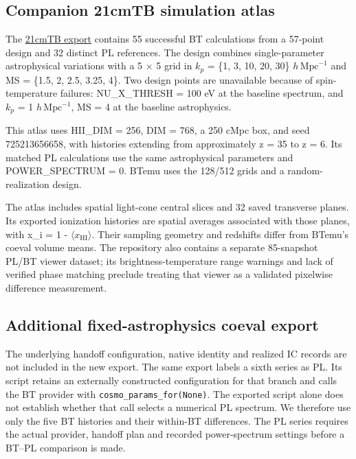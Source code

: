 \subsection{Companion 21cmTB simulation atlas}\label{companion-21cmtb-simulation-atlas}

The \href{https://github.com/HainaHuang729/21cmTB}{21cmTB export} contains 55 successful BT calculations from a 57-point design and 32 distinct PL references. The design combines single-parameter astrophysical variations with a 5 \(\times\) 5 grid in \ensuremath{k_p} = \{1, 3, 10, 20, 30\} $h\,\mathrm{Mpc}^{-1}$ and MS = \{1.5, 2, 2.5, 3.25, 4\}. Two design points are unavailable because of spin-temperature failures: NU\_X\_THRESH = 100 eV at the baseline spectrum, and \ensuremath{k_p} = 1 $h\,\mathrm{Mpc}^{-1}$, MS = 4 at the baseline astrophysics.

This atlas uses HII\_DIM = 256, DIM = 768, a 250 cMpc box, and seed 725213656658, with histories extending from approximately z = 35 to z = 6. Its matched PL calculations use the same astrophysical parameters and POWER\_SPECTRUM = 0. BTemu uses the 128/512 grids and a random-realization design.

The atlas includes spatial light-cone central slices and 32 saved transverse planes. Its exported ionization histories are spatial averages associated with those planes, with x\_i = 1 - \(\langle\)\ensuremath{x_{\mathrm{HI}}}\(\rangle\). Their sampling geometry and redshifts differ from BTemu's coeval volume means. The repository also contains a separate 85-snapshot PL/BT viewer dataset; its brightness-temperature range warnings and lack of verified phase matching preclude treating that viewer as a validated pixelwise difference measurement.

\subsection{Additional fixed-astrophysics coeval export}\label{app:fixed-astro-update}

The underlying handoff configuration, native identity and realized IC records are not included in the new export. The same export labels a sixth series as PL. Its script retains an externally constructed configuration for that branch and calls the BT provider with \texttt{cosmo\_params\_for(None)}. The exported script alone does not establish whether that call selects a numerical PL spectrum. We therefore use only the five BT histories and their within-BT differences. The PL series requires the actual provider, handoff plan and recorded power-spectrum settings before a BT--PL comparison is made.

